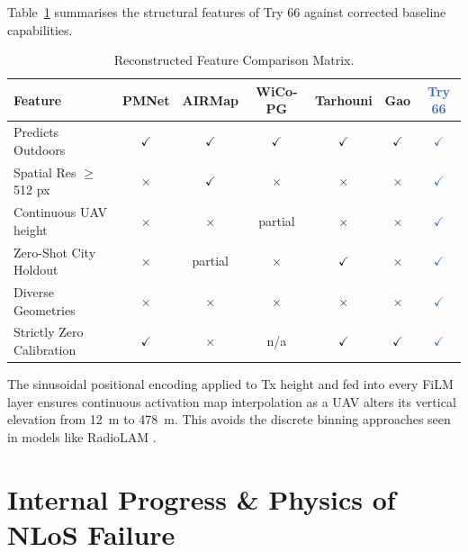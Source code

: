 \documentclass[11pt,a4paper]{article}
\newcommand{\ours}[1]{\textcolor{highlight}{\textbf{#1}}}
\newcommand{\yes}{$\checkmark$}
\newcommand{\no}{$\times$}
\begin{document}
Table~\ref{tab:novelty} summarises the structural features of Try 66 against corrected baseline capabilities. 

\begin{table}[h!]
\centering
\caption{Reconstructed Feature Comparison Matrix.}
\label{tab:novelty}
\small
\begin{tabular}{lcccccc}
\toprule
\textbf{Feature} & \textbf{PMNet} & \textbf{AIRMap} & \textbf{WiCo-PG}
    & \textbf{Tarhouni} & \textbf{Gao} & \ours{\textbf{Try 66}} \\
\midrule
Predicts Outdoors & \yes & \yes & \yes & \yes & \yes & \ours{\yes} \\
Spatial Res $\ge$ 512 px & \no & \yes & \no & \no & \no & \ours{\yes} \\
Continuous UAV height & \no & \no & partial & \no & \no & \ours{\yes} \\
Zero-Shot City Holdout & \no & partial & \no & \yes & \no & \ours{\yes} \\
Diverse Geometries & \no & \no & \no & \no & \no & \ours{\yes} \\
Strictly Zero Calibration & \yes & \no & n/a & \yes & \yes & \ours{\yes} \\
\bottomrule
\end{tabular}
\end{table}

The sinusoidal positional encoding applied to Tx height and fed into every FiLM layer ensures continuous activation map interpolation as a UAV alters its vertical elevation from 12~m to 478~m. This avoids the discrete binning approaches seen in models like RadioLAM \cite{radiolam2025}.

\section{Internal Progress \& Physics of NLoS Failure}
\label{sec:progress}
\end{document}
